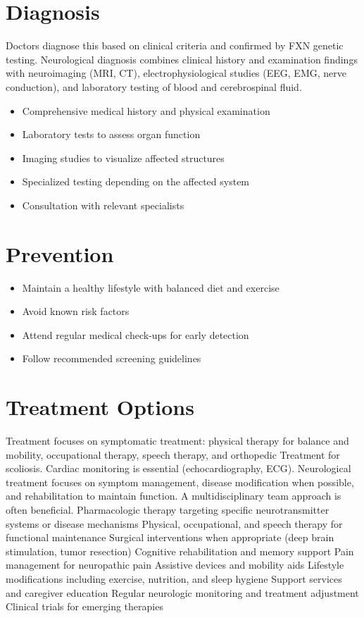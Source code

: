 \section{Diagnosis}
Doctors diagnose this based on clinical criteria and confirmed by FXN genetic testing. Neurological diagnosis combines clinical history and examination findings with neuroimaging (MRI, CT), electrophysiological studies (EEG, EMG, nerve conduction), and laboratory testing of blood and cerebrospinal fluid.

\begin{itemize}[noitemsep]
  \item Comprehensive medical history and physical examination
  \item Laboratory tests to assess organ function
  \item Imaging studies to visualize affected structures
  \item Specialized testing depending on the affected system
  \item Consultation with relevant specialists
\end{itemize}
\section{Prevention}
\begin{itemize}[noitemsep]
  \item Maintain a healthy lifestyle with balanced diet and exercise
  \item Avoid known risk factors
  \item Attend regular medical check-ups for early detection
  \item Follow recommended screening guidelines
\end{itemize}
\section{Treatment Options}
Treatment focuses on symptomatic treatment: physical therapy for balance and mobility, occupational therapy, speech therapy, and orthopedic Treatment for scoliosis. Cardiac monitoring is essential (echocardiography, ECG). Neurological treatment focuses on symptom management, disease modification when possible, and rehabilitation to maintain function. A multidisciplinary team approach is often beneficial. Pharmacologic therapy targeting specific neurotransmitter systems or disease mechanisms Physical, occupational, and speech therapy for functional maintenance Surgical interventions when appropriate (deep brain stimulation, tumor resection) Cognitive rehabilitation and memory support Pain management for neuropathic pain Assistive devices and mobility aids Lifestyle modifications including exercise, nutrition, and sleep hygiene Support services and caregiver education Regular neurologic monitoring and treatment adjustment Clinical trials for emerging therapies

